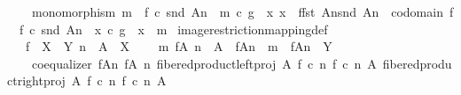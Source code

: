 \begin{isabellebody}
\ \ \ \ monomorphism\ m\ {\isasymand}\ f\ {\isasymcirc}\isactrlsub c\ snd\ An\ {\isacharequal}{\kern0pt}\ m\ {\isasymcirc}\isactrlsub c\ g\ {\isasymand}\ {\isacharparenleft}{\kern0pt}{\isasymforall}x{\isachardot}{\kern0pt}\ x\ {\isacharcolon}{\kern0pt}\ f{\isasymlparr}fst\ An{\isasymrparr}\isactrlbsub snd\ An\isactrlesub \ {\isasymrightarrow}\ codomain\ f\ {\isasymlongrightarrow}\ f\ {\isasymcirc}\isactrlsub c\ snd\ An\ {\isacharequal}{\kern0pt}\ x\ {\isasymcirc}\isactrlsub c\ g\ {\isasymlongrightarrow}\ x\ {\isacharequal}{\kern0pt}\ m{\isacharparenright}{\kern0pt}{\isacharparenright}{\kern0pt}{\isachardoublequoteclose}\isanewline
\isanewline
{}\isamarkupfalse%
\ image{\isacharunderscore}{\kern0pt}restriction{\isacharunderscore}{\kern0pt}mapping{\isacharunderscore}{\kern0pt}def{}{\isacharcolon}{\kern0pt}\isanewline
\ \ \ {\isachardoublequoteopen}f\ {\isacharcolon}{\kern0pt}\ X\ {\isasymrightarrow}\ Y{\isachardoublequoteclose}\ {\isachardoublequoteopen}n\ {\isacharcolon}{\kern0pt}\ A\ {\isasymrightarrow}\ X{\isachardoublequoteclose}\isanewline
\ \ \ {\isachardoublequoteopen}{\isasymexists}\ m{\isachardot}{\kern0pt}\ f{\isasymrestriction}\isactrlbsub {\isacharparenleft}{\kern0pt}A{\isacharcomma}{\kern0pt}\ n{\isacharparenright}{\kern0pt}\isactrlesub \ {\isacharcolon}{\kern0pt}\ A\ {\isasymrightarrow}\ f{\isasymlparr}A{\isasymrparr}\isactrlbsub n\isactrlesub \ {\isasymand}\ m\ {\isacharcolon}{\kern0pt}\ f{\isasymlparr}A{\isasymrparr}\isactrlbsub n\isactrlesub \ {\isasymrightarrow}\ Y\ {\isasymand}\isanewline
\ \ \ \ coequalizer\ {\isacharparenleft}{\kern0pt}f{\isasymlparr}A{\isasymrparr}\isactrlbsub n\isactrlesub {\isacharparenright}{\kern0pt}\ {\isacharparenleft}{\kern0pt}f{\isasymrestriction}\isactrlbsub {\isacharparenleft}{\kern0pt}A{\isacharcomma}{\kern0pt}\ n{\isacharparenright}{\kern0pt}\isactrlesub {\isacharparenright}{\kern0pt}\ {\isacharparenleft}{\kern0pt}fibered{\isacharunderscore}{\kern0pt}product{\isacharunderscore}{\kern0pt}left{\isacharunderscore}{\kern0pt}proj\ A\ {\isacharparenleft}{\kern0pt}f\ {\isasymcirc}\isactrlsub c\ n{\isacharparenright}{\kern0pt}\ {\isacharparenleft}{\kern0pt}f\ {\isasymcirc}\isactrlsub c\ n{\isacharparenright}{\kern0pt}\ A{\isacharparenright}{\kern0pt}\ {\isacharparenleft}{\kern0pt}fibered{\isacharunderscore}{\kern0pt}product{\isacharunderscore}{\kern0pt}right{\isacharunderscore}{\kern0pt}proj\ A\ {\isacharparenleft}{\kern0pt}f\ {\isasymcirc}\isactrlsub c\ n{\isacharparenright}{\kern0pt}\ {\isacharparenleft}{\kern0pt}f\ {\isasymcirc}\isactrlsub c\ n{\isacharparenright}{\kern0pt}\ A{\isacharparenright}{\kern0pt}\ {\isasymand}\isanewline

\end{isabellebody}

